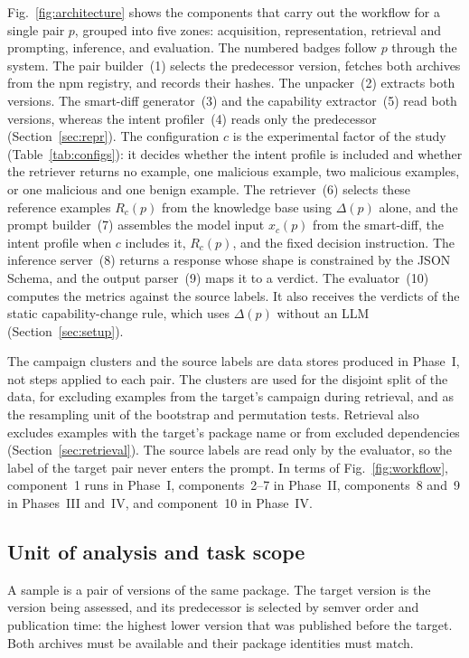 \documentclass[a4paper,fleqn]{cas-dc}
\begin{document}
Fig.~\ref{fig:architecture} shows the components that carry out the workflow
for a single pair $p$, grouped into five zones: acquisition, representation,
retrieval and prompting, inference, and evaluation. The numbered badges follow
$p$ through the system. The pair builder~(1) selects the predecessor version,
fetches both archives from the npm registry, and records their hashes. The
unpacker~(2) extracts both versions. The smart-diff generator~(3) and the
capability extractor~(5) read both versions, whereas the intent profiler~(4)
reads only the predecessor (Section~\ref{sec:repr}). The configuration $c$ is
the experimental factor of the study (Table~\ref{tab:configs}): it decides
whether the intent profile is included and whether the retriever returns no
example, one malicious example, two malicious examples, or one malicious and one
benign example. The retriever~(6) selects these reference examples $R_c(p)$ from
the knowledge base using $\Delta(p)$ alone, and the prompt builder~(7) assembles
the model input $x_c(p)$ from the smart-diff, the intent profile when $c$
includes it, $R_c(p)$, and the fixed decision instruction. The inference
server~(8) returns a response whose shape is constrained by the JSON Schema, and
the output parser~(9) maps it to a verdict. The evaluator~(10) computes the
metrics against the source labels. It also receives the verdicts of the static
capability-change rule, which uses $\Delta(p)$ without an LLM
(Section~\ref{sec:setup}).

The campaign clusters and the source labels are data stores produced in
Phase~I, not steps applied to each pair. The clusters are used for the disjoint
split of the data, for excluding examples from the target's campaign during
retrieval, and as the resampling unit of the bootstrap and permutation tests.
Retrieval also excludes examples with the target's package name or from
excluded dependencies (Section~\ref{sec:retrieval}). The source labels are read
only by the evaluator, so the label of the target pair never enters the prompt.
In terms of Fig.~\ref{fig:workflow}, component~1 runs in Phase~I, components~2--7
in Phase~II, components~8 and~9 in Phases~III and~IV, and component~10 in
Phase~IV.

\subsection{Unit of analysis and task scope}\label{sec:unit}
A sample is a pair of versions of the same package. The target version is the
version being assessed, and its predecessor is selected by semver order and
publication time: the highest lower version that was published before the
target. Both archives must be available and their package identities must match.
\end{document}
